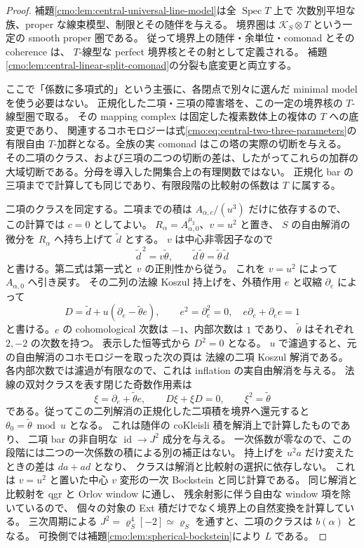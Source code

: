 \begin{proof}
補題\ref{cmo:lem:central-universal-line-model}は全 $\operatorname{Spec}T$ 上で
次数別平坦な族、proper な線束模型、制限とその随伴を与える。
境界圏は $\mathcal K_S\otimes T$ という一定の smooth proper 圏である。
従って境界上の随伴・余単位・comonad とその coherence は、
$T$-線型な perfect 境界核とその射として定義される。
補題\ref{cmo:lem:central-linear-split-comonad}の分裂も底変更と両立する。

ここで「係数に多項式的」という主張に、各閉点で別々に選んだ
minimal model を使う必要はない。
正規化した二項・三項の障害塔を、この一定の境界核の $T$-線型圏で取る。
その mapping complex は固定した複素数体上の複体の $T$ への底変更であり、
関連するコホモロジーは式\eqref{cmo:eq:central-two-three-parameters}の
有限自由 $T$-加群となる。全族の実 comonad はこの塔の実際の切断を与える。
その二項のクラス、および三項の二つの切断の差は、したがってこれらの加群の
大域切断である。分母を導入した開集合上の有理関数ではない。
正規化 bar の三項までで計算しても同じであり、有限段階の比較射の係数は $T$ に属する。

二項のクラスを同定する。二項までの積は $A_{\alpha,c}/(u^3)$ だけに依存するので、
この計算では $c=0$ としてよい。
$R_\alpha=A_{\alpha,0}^{\mu_2}$、$v=u^2$ と置き、
$S$ の自由解消の微分を $R_\alpha$ へ持ち上げて $\widetilde d$ とする。
$v$ は中心非零因子なので
\[
 \widetilde d^{\,2}=v\widetilde\theta,\qquad
 \widetilde d\,\widetilde\theta
       =\widetilde\theta\,\widetilde d
\]
と書ける。第二式は第一式と $v$ の正則性から従う。
これを $v=u^2$ によって $A_{\alpha,0}$ へ引き戻す。
その二列の法線 Koszul 持上げを、外積作用 $e$ と収縮 $\partial_e$ によって
\[
 D=\widetilde d+u(\partial_e-\widetilde\theta e),\qquad
 e^2=\partial_e^2=0,\quad
 e\partial_e+\partial_e e=1
\]
と書ける。$e$ の cohomological 次数は $-1$、内部次数は $1$ であり、
$\widetilde\theta$ はそれぞれ $2,-2$ の次数を持つ。
表示した恒等式から $D^2=0$ となる。
$u$ で濾過すると、元の自由解消のコホモロジーを取った次の頁は
法線の二項 Koszul 解消である。
各内部次数では濾過が有限なので、これは inflation の実自由解消を与える。
法線の双対クラスを表す閉じた奇数作用素は
\[
 \xi=\partial_e+\widetilde\theta e,\qquad
 D\xi+\xi D=0,\qquad \xi^2=\widetilde\theta
\]
である。従ってこの二列解消の正規化した二項積を境界へ還元すると
$\theta_0=\widetilde\theta\bmod u$ となる。
これは随伴の coKleisli 積を解消上で計算したものであり、
二項 bar の非自明な $\operatorname{id}\to J^2$ 成分を与える。
一次係数が零なので、この段階には二つの一次係数の積による別の補正はない。
持上げを $u^2a$ だけ変えたときの差は $da+ad$ となり、
クラスは解消と比較射の選択に依存しない。
これは $v=u^2$ と置いた中心 $v$ 変形の一次 Bockstein と同じ計算である。
同じ解消と比較射を qgr と Orlov window に通し、
残余射影に伴う自由な window 項を除いているので、
個々の対象の Ext 積だけでなく境界上の自然変換を計算している。
三次周期による
$J^2=\varrho_S^4[-2]\simeq\varrho_S$
を通すと、二項のクラスは $b(\alpha)$ となる。
可換側では補題\ref{cmo:lem:spherical-bockstein}により $L$ である。


\end{proof}
